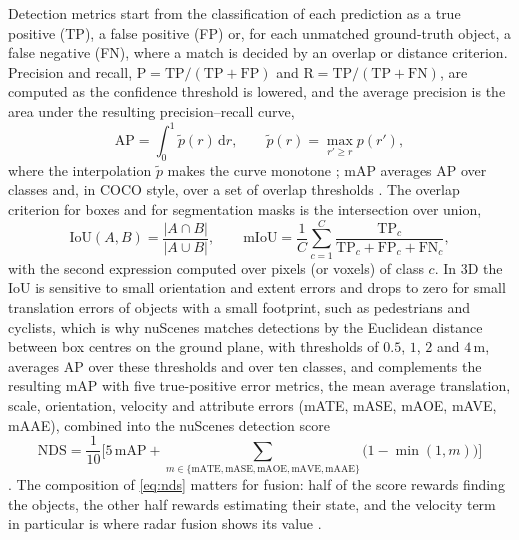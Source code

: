 \documentclass[graybox,envcountchap]{style/SNmono}
\begin{document}
Detection metrics start from the classification of each prediction as a true positive (TP), a false positive (FP) or, for each unmatched ground-truth object, a false negative (FN), where a match is decided by an overlap or distance criterion. Precision and recall, $\mathrm{P}=\mathrm{TP}/(\mathrm{TP}+\mathrm{FP})$ and $\mathrm{R}=\mathrm{TP}/(\mathrm{TP}+\mathrm{FN})$, are computed as the confidence threshold is lowered, and the average precision is the area under the resulting precision--recall curve,
\begin{equation}
\mathrm{AP}=\int_{0}^{1}\tilde{p}(r)\,\mathrm{d}r,\qquad \tilde{p}(r)=\max_{r'\ge r}p(r'),
\label{eq:ap}
\end{equation}
where the interpolation $\tilde{p}$ makes the curve monotone \cite{everingham2010_voc}; mAP averages AP over classes and, in COCO style, over a set of overlap thresholds \cite{lin2014_coco}. The overlap criterion for boxes and for segmentation masks is the intersection over union,
\begin{equation}
\mathrm{IoU}(A,B)=\frac{|A\cap B|}{|A\cup B|},\qquad
\mathrm{mIoU}=\frac{1}{C}\sum_{c=1}^{C}\frac{\mathrm{TP}_{c}}{\mathrm{TP}_{c}+\mathrm{FP}_{c}+\mathrm{FN}_{c}},
\label{eq:iou}
\end{equation}
with the second expression computed over pixels (or voxels) of class $c$. In 3D the IoU is sensitive to small orientation and extent errors and drops to zero for small translation errors of objects with a small footprint, such as pedestrians and cyclists, which is why nuScenes matches detections by the Euclidean distance between box centres on the ground plane, with thresholds of $0.5$, $1$, $2$ and $4$\,m, averages AP over these thresholds and over ten classes, and complements the resulting mAP with five true-positive error metrics, the mean average translation, scale, orientation, velocity and attribute errors (mATE, mASE, mAOE, mAVE, mAAE), combined into the nuScenes detection score
\begin{equation}
\mathrm{NDS}=\frac{1}{10}\Big[5\,\mathrm{mAP}+\sum_{m\in\{\mathrm{mATE},\mathrm{mASE},\mathrm{mAOE},\mathrm{mAVE},\mathrm{mAAE}\}}\big(1-\min(1,m)\big)\Big]
\label{eq:nds}
\end{equation}
\cite{caesar2020_nuscenes}. The composition of \eqref{eq:nds} matters for fusion: half of the score rewards finding the objects, the other half rewards estimating their state, and the velocity term in particular is where radar fusion shows its value \cite{nabati2021_centerfusion,kim2023_crn}.
\end{document}
